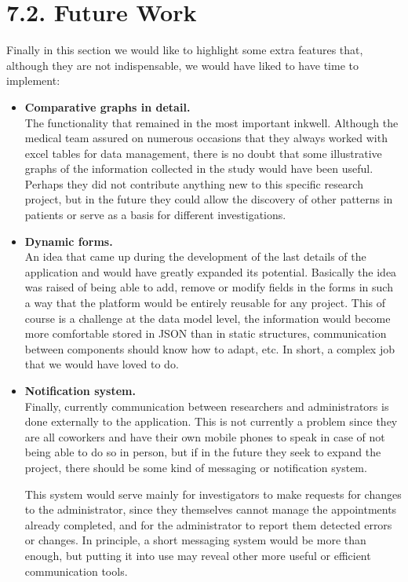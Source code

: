  \section*{7.2. Future Work}
      
Finally in this section we would like to highlight some extra features that, although they are not indispensable, we would have liked to have time to implement:
 \newline
 
 \begin{itemize}
  \item\textbf{Comparative graphs in detail.} \\
The functionality that remained in the most important inkwell. Although the medical team assured on numerous occasions that they always worked with excel tables for data management, there is no doubt that some illustrative graphs of the information collected in the study would have been useful. Perhaps they did not contribute anything new to this specific research project, but in the future they could allow the discovery of other patterns in patients or serve as a basis for different investigations. \\
  
  \item\textbf{Dynamic forms.} \\
  An idea that came up during the development of the last details of the application and would have greatly expanded its potential. Basically the idea was raised of being able to add, remove or modify fields in the forms in such a way that the platform would be entirely reusable for any project. This of course is a challenge at the data model level, the information would become more comfortable stored in JSON than in static structures, communication between components should know how to adapt, etc. In short, a complex job that we would have loved to do. \\
  
  \item\textbf{Notification system.} \\
  Finally, currently communication between researchers and administrators is done externally to the application. This is not currently a problem since they are all coworkers and have their own mobile phones to speak in case of not being able to do so in person, but if in the future they seek to expand the project, there should be some kind of messaging or notification system.
  \newline
  
  This system would serve mainly for investigators to make requests for changes to the administrator, since they themselves cannot manage the appointments already completed, and for the administrator to report them detected errors or changes. In principle, a short messaging system would be more than enough, but putting it into use may reveal other more useful or efficient communication tools. \\

\end{itemize}
    
    
    
    
    
    